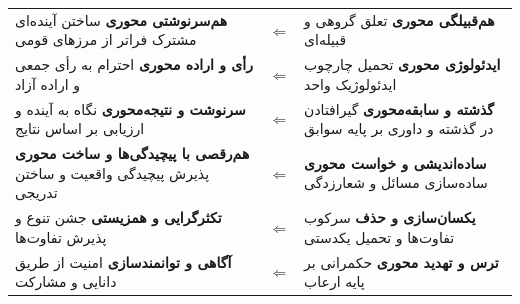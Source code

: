\begin{tcolorbox}
\begin{tabularx}{\linewidth}{
  >{\raggedleft\arraybackslash\columncolor{SoftGreen}}X
  c
  >{\raggedleft\arraybackslash\columncolor{SoftRed}}X
}
\textbf{هم‌سرنوشتی محوری}\newline
\scriptsize ساختن آینده‌ای مشترک فراتر از مرزهای قومی
  & {\color{MahestanBlue}$\Longleftarrow$}
  & \textbf{هم‌قبیلگی محوری}\newline
\scriptsize تعلق گروهی و قبیله‌ای \\

\textbf{رأی و اراده محوری}\newline
\scriptsize احترام به رأی جمعی و اراده آزاد
  & {\color{MahestanBlue}$\Longleftarrow$}
  & \textbf{ایدئولوژی محوری}\newline
\scriptsize تحمیل چارچوب ایدئولوژیک واحد \\

\textbf{سرنوشت و نتیجه‌محوری}\newline
\scriptsize نگاه به آینده و ارزیابی بر اساس نتایج
  & {\color{MahestanBlue}$\Longleftarrow$}
  & \textbf{گذشته و سابقه‌محوری}\newline
\scriptsize گیرافتادن در گذشته و داوری بر پایه سوابق \\

\textbf{هم‌رقصی با پیچیدگی‌ها و ساخت محوری}\newline
\scriptsize پذیرش پیچیدگی واقعیت و ساختن تدریجی
  & {\color{MahestanBlue}$\Longleftarrow$}
  & \textbf{ساده‌اندیشی و خواست محوری}\newline
\scriptsize ساده‌سازی مسائل و شعارزدگی \\

\textbf{تکثرگرایی و همزیستی}\newline
\scriptsize جشن تنوع و پذیرش تفاوت‌ها
  & {\color{MahestanBlue}$\Longleftarrow$}
  & \textbf{یکسان‌سازی و حذف}\newline
\scriptsize سرکوب تفاوت‌ها و تحمیل یکدستی \\

\textbf{آگاهی و توانمندسازی}\newline
\scriptsize امنیت از طریق دانایی و مشارکت
  & {\color{MahestanBlue}$\Longleftarrow$}
  & \textbf{ترس و تهدید محوری}\newline
\scriptsize حکمرانی بر پایه ارعاب \\

\bottomrule
\end{tabularx}

\end{tcolorbox}